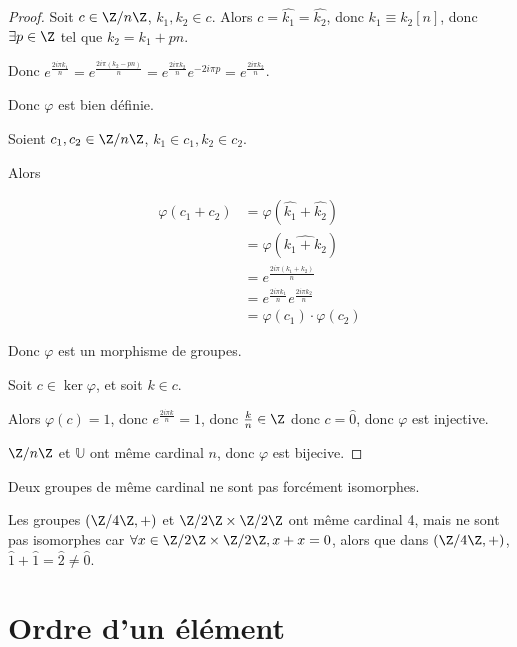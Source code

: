 \begin{proof}
    Soit $c \in \Z /n \Z$, $k_1, k_2 \in c$. Alors $c = \hat{k_1} = \hat{k_2}$, donc
    $k_1 \equiv k_2 [n]$, donc $\exists p \in \Z$ tel que $k_2 = k_1 + pn$.

    Donc $\displaystyle e^{\frac{2i\pi k_1}n} = e^{\frac{2i\pi (k_2 - pn)} n} = e^{\frac{2i\pi k_2} n} e^{-2i\pi p} = e^{\frac{2i\pi k_2} n}$.

    Donc $\varphi$ est bien définie.

    \svspace Soient $c_1, c_2 \in \Z/n\Z$, $k_1 \in c_1, k_2 \in c_2$.

    Alors

     $$\begin{aligned}
        \varphi(c_1 + c_2) & = \varphi(\hat{k_1} + \hat{k_2}) \\
        & = \varphi(\widehat{k_1 + k_2}) \\
        & = e^{\frac{2i\pi (k_1 + k_2)} n} \\
        & = e^{\frac{2i\pi k_1} n} e^{\frac{2i\pi k_2} n} \\
        & = \varphi(c_1) \cdot \varphi(c_2)
    \end{aligned}$$

    Donc $\varphi$ est un morphisme de groupes.

    Soit $c \in \ker \varphi$, et soit $k \in c$.

    Alors $\varphi(c) = 1$, donc $e^{\frac{2i\pi k} n} = 1$, donc $\frac k n \in \Z$ donc 
    $c = \hat 0$, donc $\varphi$ est injective.

    \avspace $\Z / n \Z$ et $\mathbb U$ ont même cardinal $n$, donc $\varphi$ est bijecive.
\end{proof}


\begin{remarque}
    Deux groupes de même cardinal ne sont pas forcément isomorphes.
\end{remarque}

\begin{exemple}
    Les groupes $(\Z/4\Z, +)$ et $\Z / 2\Z \times \Z / 2\Z$ ont même cardinal 4,
    mais ne sont pas isomorphes car $\forall x \in \Z / 2\Z \times \Z / 2\Z, x + x = 0$,
    alors que dans $(\Z/4\Z, +)$, $\hat 1 + \hat 1 = \hat 2 \neq \hat 0$.
\end{exemple}

\section{Ordre d'un élément}

